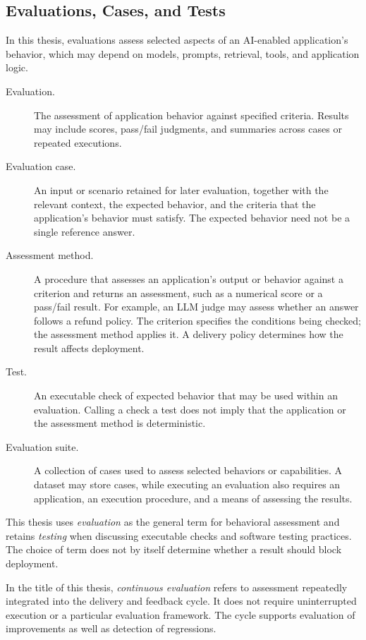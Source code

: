 \subsection{Evaluations, Cases, and Tests}

In this thesis, evaluations assess selected aspects of an AI-enabled
application's behavior, which may depend on models, prompts, retrieval, tools,
and application logic.

\begin{description}
  \item[Evaluation.] The assessment of application behavior against specified
    criteria. Results may include scores, pass/fail judgments, and summaries
    across cases or repeated executions.
  \item[Evaluation case.] An input or scenario retained for later evaluation,
    together with the relevant context, the expected behavior, and the criteria
    that the application's behavior must satisfy. The expected behavior need not
    be a single reference answer.
  \item[Assessment method.] A procedure that assesses an application's output or
    behavior against a criterion and returns an assessment, such as a numerical
    score or a pass/fail result. For example, an LLM judge may assess whether an
    answer follows a refund policy. The criterion specifies the conditions being
    checked; the assessment method applies it. A delivery policy determines how
    the result affects deployment.
  \item[Test.] An executable check of expected behavior that may be used within
    an evaluation. Calling a check a test does not imply that the application
    or the assessment method is deterministic.
  \item[Evaluation suite.] A collection of cases used to assess selected
    behaviors or capabilities. A dataset may store cases, while executing an
    evaluation also requires an application, an execution procedure, and a
    means of assessing the results.
\end{description}

This thesis uses \emph{evaluation} as the general term for behavioral assessment
and retains \emph{testing} when discussing executable checks and software
testing practices. The choice of term does not by itself determine whether a
result should block deployment.

In the title of this thesis, \emph{continuous evaluation} refers to assessment
repeatedly integrated into the delivery and feedback cycle. It does not require
uninterrupted execution or a particular evaluation framework. The cycle
supports evaluation of improvements as well as detection of regressions.

